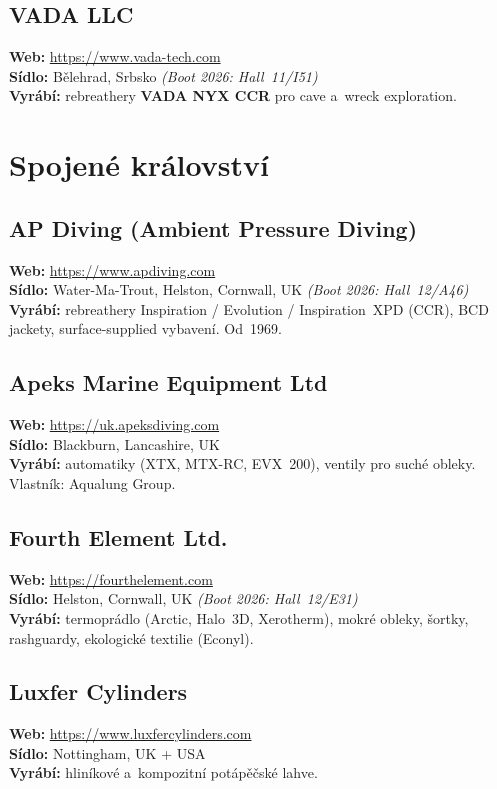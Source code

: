 \documentclass[11pt,a4paper]{article}
\begin{document}
\subsection{VADA LLC}
\textbf{Web:} \url{https://www.vada-tech.com} \\
\textbf{Sídlo:} Bělehrad, Srbsko \quad\emph{(Boot 2026: Hall~11/I51)} \\
\textbf{Vyrábí:} rebreathery \textbf{VADA NYX CCR} pro cave a~wreck exploration.

\section{Spojené království}

\subsection{AP Diving (Ambient Pressure Diving)}
\textbf{Web:} \url{https://www.apdiving.com} \\
\textbf{Sídlo:} Water-Ma-Trout, Helston, Cornwall, UK \quad\emph{(Boot 2026: Hall~12/A46)} \\
\textbf{Vyrábí:} rebreathery Inspiration / Evolution / Inspiration~XPD (CCR), BCD jackety, surface-supplied vybavení. Od~1969.

\subsection{Apeks Marine Equipment Ltd}
\textbf{Web:} \url{https://uk.apeksdiving.com} \\
\textbf{Sídlo:} Blackburn, Lancashire, UK \\
\textbf{Vyrábí:} automatiky (XTX, MTX-RC, EVX~200), ventily pro suché obleky. Vlastník: Aqualung Group.

\subsection{Fourth Element Ltd.}
\textbf{Web:} \url{https://fourthelement.com} \\
\textbf{Sídlo:} Helston, Cornwall, UK \quad\emph{(Boot 2026: Hall~12/E31)} \\
\textbf{Vyrábí:} termoprádlo (Arctic, Halo~3D, Xerotherm), mokré obleky, šortky, rashguardy, ekologické textilie (Econyl).

\subsection{Luxfer Cylinders}
\textbf{Web:} \url{https://www.luxfercylinders.com} \\
\textbf{Sídlo:} Nottingham, UK + USA \\
\textbf{Vyrábí:} hliníkové a~kompozitní potápěčské lahve.
\end{document}

